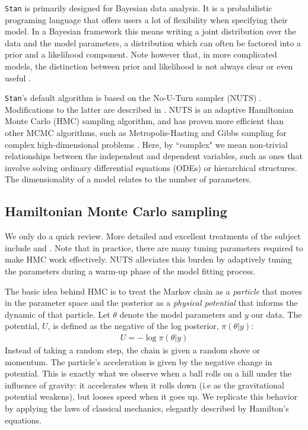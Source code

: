 \documentclass[11pt]{article}
\begin{document}
  \texttt{Stan} is primarily designed for Bayesian data analysis.
  It is a probabilistic programing language that offers users a lot of flexibility
  when specifying their model. In a Bayesian framework this means writing
  a joint distribution over the data and the model parameters,
  a distribution which can often be factored into a prior and a likelihood component.
  Note however that, in more complicated models, the distinction between prior and likelihood
  is not always clear or even useful \cite{Gelman:2017}.

  \texttt{Stan}'s default algorithm is based on the No-U-Turn sampler
  (NUTS) \cite{Hoffman:2014}. Modifications to the latter are described in \cite{Betancourt:2017}.
  NUTS is an adaptive Hamiltonian Monte Carlo (HMC) sampling algorithm,
  and has proven more efficient than other MCMC algorithms,
  such as Metropolis-Hasting and Gibbs sampling for complex high-dimensional problems
  \cite{Hoffman:2014}.
  Here, by ``complex" we mean non-trivial relationships between the independent and dependent
  variables, such as ones that involve solving ordinary differential equations (ODEs) or hierarchical structures. 
  The dimensionality of a model relates to the number of parameters.
  
  
  \subsection{Hamiltonian Monte Carlo sampling}
  
  We only do a quick review. More detailed and excellent treatments of the subject 
  include \cite{Radford:2010} and \cite{Betancourt:2017}.
  Note that in practice, there are many tuning parameters required to make HMC work effectively.
  NUTS alleviates this burden by adaptively tuning the parameters during a warm-up phase of the
  model fitting process.
    
  The basic idea behind HMC is to treat the Markov chain as a \textit{particle} that moves in the
  parameter space and the posterior as a \textit{physical potential} that informs the dynamic of
  that particle. Let $\theta$ denote the model parameters and $y$ our data.
  The potential, $U$, is defined as the negative of the log posterior, $\pi(\theta | y)$:
  \begin{eqnarray}
    U = - \log \pi(\theta | y)
  \label{eq:potential}
  \end{eqnarray}
  Instead of taking a random step, the chain is given a random shove or momentum. The
  particle's acceleration is given by the negative change in potential. This is exactly what 
  we observe when a ball rolls on a hill under the influence of gravity: it accelerates when
  it rolls down (i.e as the gravitational potential weakens), but looses speed when it goes
  up. We replicate this behavior by applying the laws of classical mechanics, elegantly 
  described by Hamilton's equations.
  
\end{document}
